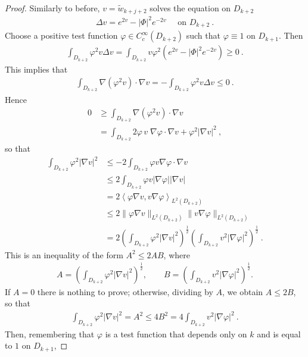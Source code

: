 \documentclass[a4paper,11pt,openright,twoside]{book}
\newcommand{\1}{\mathds{1}}
\theoremstyle{plain}
\theoremstyle{definition}
\theoremstyle{remark}
\begin{document}
\begin{proof}
	Similarly to before, $v=\tilde w_{k+j+2}$ solves the equation on $D_{k+2}$
	\begin{align*}
		\Delta v = e^{2v}-|\Phi|^2 e^{-2v}\quad\text{ on } D_{k+2}
	\ . 
	\end{align*}
	Choose a positive test function $\varphi\in C^\infty_c(D_{k+2})$ such that $\varphi\equiv 1$ on $D_{k+1}$. Then
	\begin{align*}
		\int_{D_{k+2}} \varphi^2 v\Delta v = \int_{D_{k+2}} v \varphi^2( e^{2v}-|\Phi|^2 e^{-2v}) \geq 0
	\ . 
	\end{align*}
	This implies that
	\begin{align*}
		\int_{D_{k+2}} \nabla(\varphi^2 v)\cdot \nabla v = 
		-\int_{D_{k+2}} \varphi^2 v\Delta v \leq 0 
	\ . 
	\end{align*}
	Hence 
	\begin{align*}
		0 &\geq \int_{D_{k+2}} \nabla(\varphi^2 v)\cdot \nabla v \\
		  &= \int_{D_{k+2}} 2\varphi\,v\; \nabla \varphi\cdot  \nabla v + \varphi^2 |\nabla v|^2
	\ , 
	\end{align*}
	so that
	\begin{align*}
		\int_{D_{k+2}} \varphi^2|\nabla v|^2 
		&\leq
		- 2 \int_{D_{k+2}} \varphi v \nabla\varphi \cdot \nabla v\\
		&\leq 2\int_{D_{k+2}} \varphi v |\nabla \varphi| |\nabla v|\\
		&=  2\left<\varphi \nabla v, v \nabla \varphi \right>_{L^2(D_{k+2})}\\
		&\leq 2 \|\varphi \nabla v\|_{L^2(D_{k+2})}\| v\nabla\varphi\|_{L^2(D_{k+2})} \\
		&=  2 \left( \int_{D_{k+2}} \varphi^2 |\nabla v|^2 \right)^\frac{1}{2} \left( \int_{D_{k+2}}   v^2|\nabla \varphi|^2\right)^\frac{1}{2} \ .
	\end{align*}
	This is an inequality of the form $A^2 \leq 2AB$, where
	\begin{align*}
		A = \left( \int_{D_{k+2}} \varphi^2 |\nabla v|^2 \right)^\frac{1}{2},
		\qquad
		B = \left( \int_{D_{k+2}}   v^2|\nabla \varphi|^2\right)^\frac{1}{2}.
	\end{align*}
	If $A=0$ there is nothing to prove; otherwise, dividing by $A$, we obtain $A\leq 2B$, so that
	\begin{align}\label{eq:exthm7}
		 \int_{D_{k+2}} \varphi^2|\nabla v|^2= A^2  \leq  4B^2 =4\int_{D_{k+2}}   v^2|\nabla \varphi|^2  
	\ . 
	\end{align}
	Then, remembering that $\varphi$ is a test function that depends only on $k$ and is equal to $1$ on $D_{k+1}$,

\end{proof}
\end{document}
